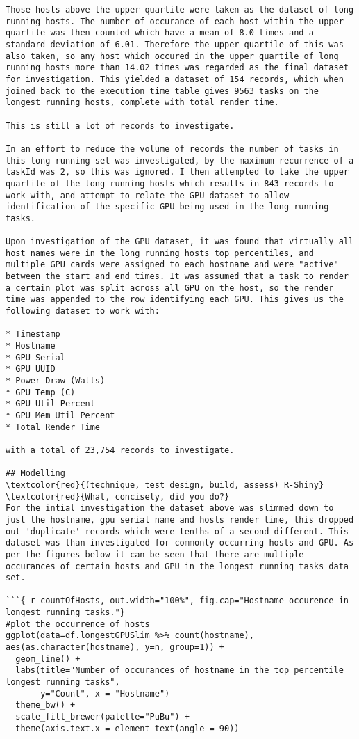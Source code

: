 \documentclass[
  twocolumn]{article}
\begin{document}
\begin{verbatim}
Those hosts above the upper quartile were taken as the dataset of long running hosts. The number of occurance of each host within the upper quartile was then counted which have a mean of 8.0 times and a standard deviation of 6.01. Therefore the upper quartile of this was also taken, so any host which occured in the upper quartile of long running hosts more than 14.02 times was regarded as the final dataset for investigation. This yielded a dataset of 154 records, which when joined back to the execution time table gives 9563 tasks on the longest running hosts, complete with total render time. 

This is still a lot of records to investigate.

In an effort to reduce the volume of records the number of tasks in this long running set was investigated, by the maximum recurrence of a taskId was 2, so this was ignored. I then attempted to take the upper quartile of the long running hosts which results in 843 records to work with, and attempt to relate the GPU dataset to allow identification of the specific GPU being used in the long running tasks.

Upon investigation of the GPU dataset, it was found that virtually all host names were in the long running hosts top percentiles, and multiple GPU cards were assigned to each hostname and were "active" between the start and end times. It was assumed that a task to render a certain plot was split across all GPU on the host, so the render time was appended to the row identifying each GPU. This gives us the following dataset to work with:

* Timestamp
* Hostname
* GPU Serial
* GPU UUID
* Power Draw (Watts)
* GPU Temp (C)
* GPU Util Percent
* GPU Mem Util Percent
* Total Render Time

with a total of 23,754 records to investigate.

## Modelling 
\textcolor{red}{(technique, test design, build, assess) R-Shiny}
\textcolor{red}{What, concisely, did you do?}
For the intial investigation the dataset above was slimmed down to just the hostname, gpu serial name and hosts render time, this dropped out 'duplicate' records which were tenths of a second different. This dataset was than investigated for commonly occurring hosts and GPU. As per the figures below it can be seen that there are multiple occurances of certain hosts and GPU in the longest running tasks data set.

```{ r countOfHosts, out.width="100%", fig.cap="Hostname occurence in longest running tasks."}
#plot the occurrence of hosts
ggplot(data=df.longestGPUSlim %>% count(hostname), aes(as.character(hostname), y=n, group=1)) +
  geom_line() +
  labs(title="Number of occurances of hostname in the top percentile longest running tasks", 
       y="Count", x = "Hostname") 
  theme_bw() + 
  scale_fill_brewer(palette="PuBu") +
  theme(axis.text.x = element_text(angle = 90))
\end{verbatim}
\end{document}
